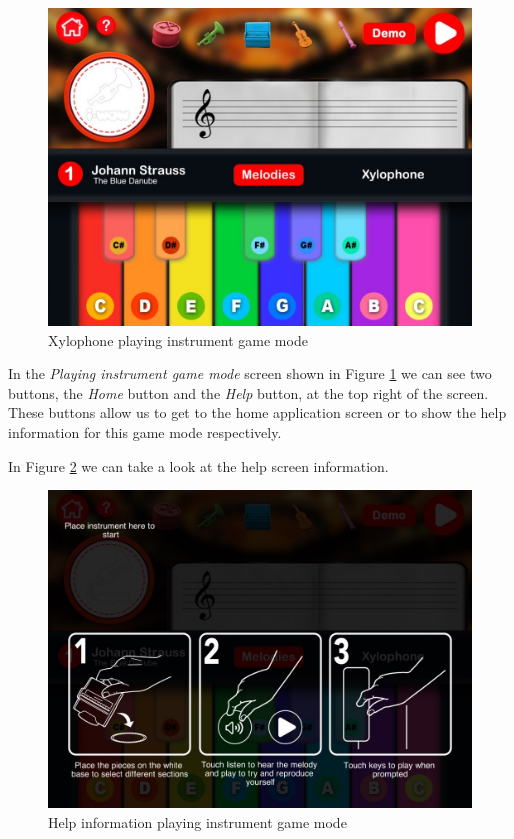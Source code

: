 \begin{figure}[ht!]
	\centering
	\includegraphics[width=400pt]{graphics/use-case/playing_xylo_start_screen.jpg}
	\caption{Xylophone playing instrument game mode}
	\label{fig:playing_xylo_start_screen}
\end{figure}

\FloatBarrier

In the \textit{Playing instrument game mode} screen shown in Figure \ref{fig:playing_xylo_start_screen} we can see two buttons, the \textit{Home} button and the \textit{Help} button, at the top right of the screen. These buttons allow us to get to the home application screen or to show the help information for this game mode respectively.

In Figure \ref{fig:help_playing_screen} we can take a look at the help screen information.

\begin{figure}[ht!]
	\centering
	\includegraphics[width=400pt]{graphics/use-case/help_playing_screen.jpg}
	\caption{Help information playing instrument game mode}
	\label{fig:help_playing_screen}
\end{figure}

